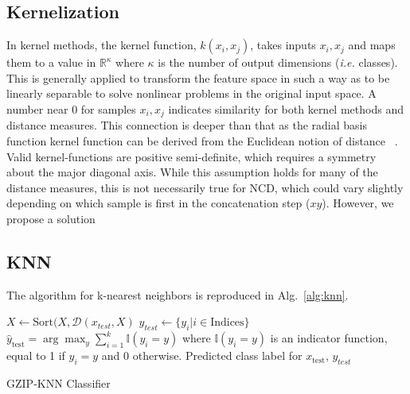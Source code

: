\documentclass[sigconf]{acmart}
\begin{document}
\subsection{Kernelization}
In kernel methods, the kernel function, $k(x_i,x_j)$, takes inputs $x_i, x_j$ and maps them to a value in $\mathbb{R}^\kappa$ where $\kappa$ is the number of output dimensions (\textit{i.e.} classes). This is generally applied to transform the feature space in such a way as to be linearly separable to solve nonlinear problems in the original input space. A number near 0 for samples $x_i, x_j$ indicates similarity for both kernel methods and distance measures. This connection is deeper than that as the radial basis function kernel function can be derived from the Euclidean notion of distance ~\cite{}. Valid kernel-functions are positive semi-definite, which requires a symmetry about the major diagonal axis. While this assumption holds for many of the distance measures, this is not necessarily true for NCD, which could vary slightly depending on which sample is first in the concatenation step ($xy$). However, we propose a solution

\subsection{KNN}
The algorithm for k-nearest neighbors is reproduced in Alg.~\ref{alg:knn}.

\begin{algorithm}
    \begin{algorithmic}[1]
    
    
    \State $ X \leftarrow \textrm{Sort}(X, \mathcal{D}(x_{test}, X)
    $
    \State $y_{test} \leftarrow \{y_i | i \in \textrm{Indices}\}$
    \State $\hat{y}_{\text{test}} = \arg\max_y \sum_{i=1}^{k} \mathbb{I}(y_i = y)$
    where $\mathbb{I}(y_i = y)$ is an indicator function, equal to 1 if $y_i = y$ and 0 otherwise.
    \State \Return Predicted class label for $x_{\text{test}}$, $y_{test}$
    \EndFor
    \caption{GZIP-KNN Classifier}
    \label{alg:knn}
    \end{algorithmic}
\end{algorithm}
\end{document}

